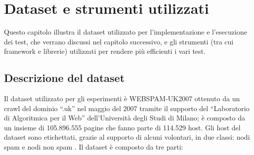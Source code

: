 \chapter{Dataset e strumenti utilizzati}
Questo capitolo illustra il dataset utilizzato per l'implementazione e l'esecuzione dei test,  che verrano discussi nel capitolo successivo, e gli strumenti (tra cui framework e librerie) utilizzati per rendere più efficienti i vari test.
\section{Descrizione del dataset}
Il dataset utilizzato per gli esperimenti è WEBSPAM-UK2007 \cite{webspam-uk2007} ottenuto da un crawl del dominio ``.uk'' nel maggio del 2007 tramite il supporto del ``Laboratorio di Algoritmica per il Web'' dell'Università degli Studi di Milano; è composto da un insieme di 105.896.555 pagine che fanno parte di 114.529 host. Gli host del dataset  sono etichettati,  grazie al supporto  di alcuni volontari,  in due classi: nodi spam e nodi non spam . Il dataset è composto da tre parti:
